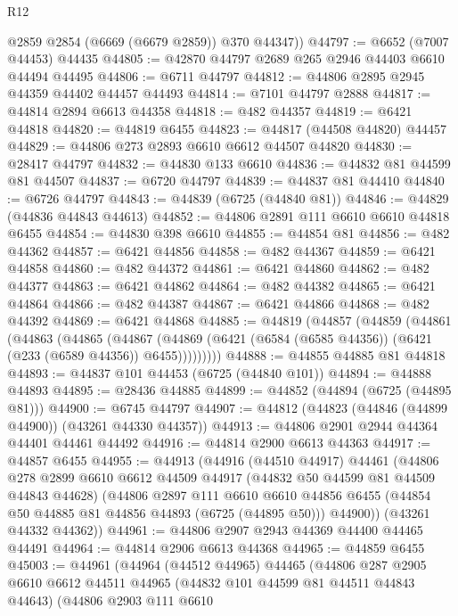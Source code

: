 \begin{lexlean}{R12}
\begin{coremodule}
        @2859
        @2854
        (@6669 (@6679 @2859))
        @370
        @44347))
@44797 := @6652 (@7007 @44453) @44435
@44805 := @42870 @44797 @2689 @265 @2946 @44403 @6610 @44494 @44495
@44806 := @6711 @44797
@44812 := @44806 @2895 @2945 @44359 @44402 @44457 @44493
@44814 := @7101 @44797 @2888
@44817 := @44814 @2894 @6613 @44358
@44818 := @482 @44357
@44819 := @6421 @44818
@44820 := @44819 @6455
@44823 := @44817 (@44508 @44820) @44457
@44829 := @44806 @273 @2893 @6610 @6612 @44507 @44820
@44830 := @28417 @44797
@44832 := @44830 @133 @6610
@44836 := @44832 @81 @44599 @81 @44507
@44837 := @6720 @44797
@44839 := @44837 @81 @44410
@44840 := @6726 @44797
@44843 := @44839 (@6725 (@44840 @81))
@44846 := @44829 (@44836 @44843 @44613)
@44852 := @44806 @2891 @111 @6610 @6610 @44818 @6455
@44854 := @44830 @398 @6610
@44855 := @44854 @81
@44856 := @482 @44362
@44857 := @6421 @44856
@44858 := @482 @44367
@44859 := @6421 @44858
@44860 := @482 @44372
@44861 := @6421 @44860
@44862 := @482 @44377
@44863 := @6421 @44862
@44864 := @482 @44382
@44865 := @6421 @44864
@44866 := @482 @44387
@44867 := @6421 @44866
@44868 := @482 @44392
@44869 := @6421 @44868
@44885 := @44819
    (@44857
      (@44859
        (@44861
          (@44863
            (@44865
              (@44867
                (@44869 (@6421 (@6584 (@6585 @44356)) (@6421 (@233 (@6589 @44356)) @6455)))))))))
@44888 := @44855 @44885 @81 @44818
@44893 := @44837 @101 @44453 (@6725 (@44840 @101))
@44894 := @44888 @44893
@44895 := @28436 @44885
@44899 := @44852 (@44894 (@6725 (@44895 @81)))
@44900 := @6745 @44797
@44907 := @44812 (@44823 (@44846 (@44899 @44900)) (@43261 @44330 @44357))
@44913 := @44806 @2901 @2944 @44364 @44401 @44461 @44492
@44916 := @44814 @2900 @6613 @44363
@44917 := @44857 @6455
@44955 := @44913
    (@44916
      (@44510 @44917)
      @44461
      (@44806
        @278
        @2899
        @6610
        @6612
        @44509
        @44917
        (@44832 @50 @44599 @81 @44509 @44843 @44628)
        (@44806
          @2897
          @111
          @6610
          @6610
          @44856
          @6455
          (@44854 @50 @44885 @81 @44856 @44893 (@6725 (@44895 @50)))
          @44900))
      (@43261 @44332 @44362))
@44961 := @44806 @2907 @2943 @44369 @44400 @44465 @44491
@44964 := @44814 @2906 @6613 @44368
@44965 := @44859 @6455
@45003 := @44961
    (@44964
      (@44512 @44965)
      @44465
      (@44806
        @287
        @2905
        @6610
        @6612
        @44511
        @44965
        (@44832 @101 @44599 @81 @44511 @44843 @44643)
        (@44806
          @2903
          @111
          @6610

\end{coremodule}
\end{lexlean}
